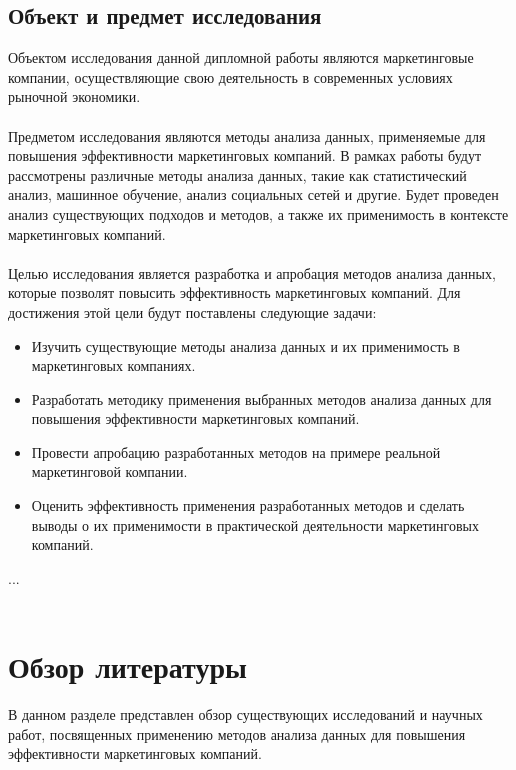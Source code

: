 \documentclass{article}
\begin{document}
\subsection{Объект и предмет исследования}
Объектом исследования данной дипломной работы являются маркетинговые компании, осуществляющие свою деятельность в современных условиях рыночной экономики.\\
~\\
Предметом исследования являются методы анализа данных, применяемые для повышения эффективности маркетинговых компаний. В рамках работы будут рассмотрены различные методы анализа данных, такие как статистический анализ, машинное обучение, анализ социальных сетей и другие. Будет проведен анализ существующих подходов и методов, а также их применимость в контексте маркетинговых компаний.\\
~\\
Целью исследования является разработка и апробация методов анализа данных, которые позволят повысить эффективность маркетинговых компаний. Для достижения этой цели будут поставлены следующие задачи:
\begin{itemize}
\item Изучить существующие методы анализа данных и их применимость в маркетинговых компаниях.
\item Разработать методику применения выбранных методов анализа данных для повышения эффективности маркетинговых компаний.
\item Провести апробацию разработанных методов на примере реальной маркетинговой компании.
\item Оценить эффективность применения разработанных методов и сделать выводы о их применимости в практической деятельности маркетинговых компаний.
\end{itemize}
...\\
~\\

\newpage
\section{Обзор литературы}
В данном разделе представлен обзор существующих исследований и научных работ, посвященных применению методов анализа данных для повышения эффективности маркетинговых компаний.
\end{document}
